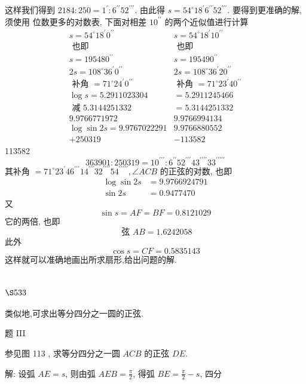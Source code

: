 这样我们得到 $2184: 250=1^{\prime}: 6^{\prime \prime} 52^{\prime \prime \prime}$. 由此得 $s=54^{\circ} 18^{\prime} 6^{\prime \prime} 52^{\prime \prime \prime}$. 要得到更准确的解, 须使用 位数更多的对数表, 下面对相差 $10^{\prime \prime}$ 的两个近似值进行计算
\[
\begin{array}{cc}
s=54^{\circ} 18^{\prime} 0^{\prime \prime} & s=54^{\circ} 18^{\prime} 10^{\prime \prime} \\
\text { 也即 } & \text { 也即 } \\
s=195480^{\prime \prime} & s=195490^{\prime \prime} \\
2 s=108^{\circ} 36^{\prime} 0^{\prime \prime} & 2 s=108^{\circ} 36^{\prime} 20^{\prime \prime} \\
\text { 补角 }=71^{\circ} 24^{\prime} 0^{\prime \prime} & \text { 补角 }=71^{\circ} 23^{\prime} 40^{\prime \prime} \\
\log s=5.2911023304 & =5.2911245466 \\
\text { 减 } 5.3144251332 & =5.3144251332 \\
\hline 9.9766771972 & 9.9766994134 \\
\log \sin 2 s=9.9767022291 & 9.9766880552 \\
+250319 & -113582
\end{array}
\]
113582
\[
363901: 250319=10^{\prime \prime \prime}: 6^{\prime \prime} 52^{\prime \prime \prime} 43^{\prime \prime \prime \prime} 33^{\prime \prime \prime \prime \prime}
\]
其补角 $=71^{\circ} 23^{\prime} 46^{\prime \prime \prime} 14^{\prime \prime \prime} 32^{\prime \prime \prime \prime} 54^{\prime \prime \prime \prime \prime}, \angle A C B$ 的正弦的对数, 也即
\[
\begin{aligned}
\log \sin 2 s & =9.9766924791 \\
\sin 2 s & =0.9477470
\end{aligned}
\]
又
\[
\sin s=A F=B F=0.8121029
\]
它的两倍, 也即 
\[
\text { 弦 } A B=1.6242058
\]
此外
\[
\cos s=C F=0.5835143
\]
这样就可以准确地画出所求扇形,给出问题的解.

\section{$\S 533$}

类似地,可求出等分四分之一圆的正弦.

题 III

参见图 113 , 求等分四分之一圆 $A C B$ 的正弦 $D E$.

解: 设弧 $A E=s$, 则由弧 $A E B=\frac{\pi}{2}$, 得弧 $B E=\frac{\pi}{2}-s$, 四分

